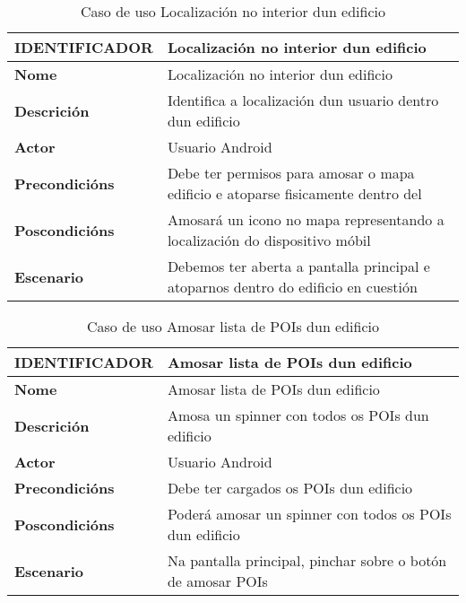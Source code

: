 \begin{table}[tbp]
	\begin{tabular}{|l|p{10cm}|}
		\hline 
		\textbf{IDENTIFICADOR}	& \textbf{Localización no interior dun edificio} \\ 
		\hline 
		\textbf{Nome} & Localización no interior dun edificio \\ 
		\hline 
		\textbf{Descrición} & Identifica a localización dun usuario dentro dun edificio \\ 
		\hline 
		\textbf{Actor} & Usuario Android \\ 
		\hline 
		\textbf{Precondicións} & Debe ter permisos para amosar o mapa edificio e atoparse fisicamente dentro del \\ 
		\hline 
		\textbf{Poscondicións} & Amosará un icono no mapa representando a localización do dispositivo móbil \\ 
		\hline 
		\textbf{Escenario} & Debemos ter aberta a pantalla principal e atoparnos dentro do edificio en cuestión \\ 
		\hline 
	\end{tabular}
	\caption{Caso de uso Localización no interior dun edificio}
	\label{tab:cuLocalizacion}
\end{table}

\begin{table}[tbp]
	\begin{tabular}{|l|p{10cm}|}
		\hline 
		\textbf{IDENTIFICADOR}	& \textbf{Amosar lista de POIs dun edificio} \\ 
		\hline 
		\textbf{Nome} & Amosar lista de POIs dun edificio \\ 
		\hline 
		\textbf{Descrición} & Amosa un spinner con todos os POIs dun edificio \\ 
		\hline 
		\textbf{Actor} & Usuario Android \\ 
		\hline 
		\textbf{Precondicións} & Debe ter cargados os POIs dun edificio \\ 
		\hline 
		\textbf{Poscondicións} & Poderá amosar un spinner con todos os POIs dun edificio \\ 
		\hline 
		\textbf{Escenario} & Na pantalla principal, pinchar sobre o botón de amosar POIs \\ 
		\hline 
	\end{tabular}
	\caption{Caso de uso Amosar lista de POIs dun edificio}
	\label{tab:cuAmosarListaPOI}
\end{table}

